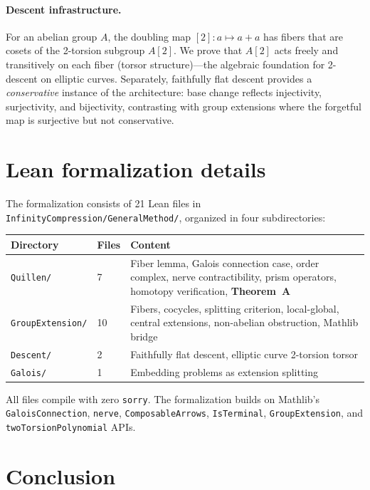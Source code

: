 \documentclass[11pt]{article}
\begin{document}
\paragraph{Descent infrastructure.}
For an abelian group $A$, the doubling map $[2] : a \mapsto a + a$ has fibers
that are cosets of the 2-torsion subgroup $A[2]$. We prove that $A[2]$ acts
freely and transitively on each fiber (torsor structure)---the algebraic
foundation for 2-descent on elliptic curves. Separately, faithfully flat
descent provides a \emph{conservative} instance of the architecture: base
change reflects injectivity, surjectivity, and bijectivity, contrasting with
group extensions where the forgetful map is surjective but not conservative.

\section{Lean formalization details}\label{sec:lean}

The formalization consists of 21 Lean files in
\texttt{InfinityCompression/GeneralMethod/}, organized in four subdirectories:

\begin{center}
\footnotesize
\begin{tabular}{@{}llp{}@{}}
\toprule
\textbf{Directory} & \textbf{Files} & \textbf{Content} \\
\midrule
\texttt{Quillen/} & 7 &
  Fiber lemma, Galois connection case, order complex, nerve contractibility,
  prism operators, homotopy verification, \textbf{Theorem~A} \\
\texttt{GroupExtension/} & 10 &
  Fibers, cocycles, splitting criterion, local-global, central extensions,
  non-abelian obstruction, Mathlib bridge \\
\texttt{Descent/} & 2 &
  Faithfully flat descent, elliptic curve 2-torsion torsor \\
\texttt{Galois/} & 1 &
  Embedding problems as extension splitting \\
\bottomrule
\end{tabular}
\end{center}

All files compile with zero \texttt{sorry}. The formalization builds on
Mathlib's \texttt{GaloisConnection}, \texttt{nerve}, \texttt{ComposableArrows},
\texttt{IsTerminal}, \texttt{GroupExtension}, and \texttt{twoTorsionPolynomial}
APIs.

\section{Conclusion}\label{sec:conclusion}
\end{document}
